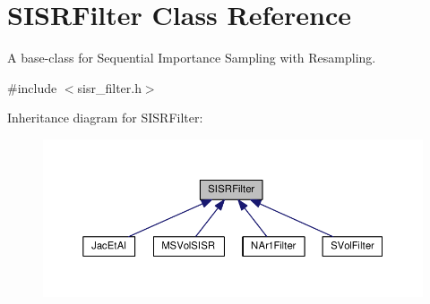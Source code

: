 \hypertarget{classSISRFilter}{}\section{S\+I\+S\+R\+Filter Class Reference}
\label{classSISRFilter}


A base-\/class for Sequential Importance Sampling with Resampling.  




{\ttfamily \#include $<$sisr\+\_\+filter.\+h$>$}



Inheritance diagram for S\+I\+S\+R\+Filter\+:\nopagebreak
\begin{figure}[H]
\begin{center}
\leavevmode
\includegraphics[width=350pt]{classSISRFilter__inherit__graph}
\end{center}
\end{figure}
